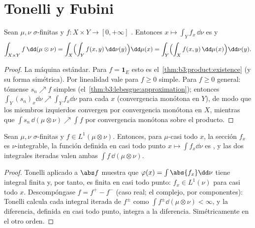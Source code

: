 \section{Tonelli y Fubini}

\begin{theorem}[Tonelli]\label{thm:b3:product:tonelli}
Sean $\mu, \nu$ $\sigma$-finitas y $f \colon X\times Y \to [0,
+\infty]$ . Entonces
$x \mapsto \int_Y f_x\,\dd\nu$ es
 y
\[
\int_{X\times Y}f\,\dd(\mu\otimes\nu)
= \int_X\Bigl(\int_Y f(x,y)\,\dd\nu(y)\Bigr)\dd\mu(x)
= \int_Y\Bigl(\int_X f(x,y)\,\dd\mu(x)\Bigr)\dd\nu(y).
\]
\end{theorem}

\begin{proof}
La máquina estándar. Para $f = \mathbf 1_E$ esto es
el~\cref{thm:b3:product:existence} (y su forma simétrica). Por
linealidad vale para $f \geq 0$ simple. Para $f \geq
0$ general: tómense $s_n \nearrow f$ simples
(el~\cref{thm:b3:lebesgue:approximation}); entonces $\int_Y(s_n)_x
\dd\nu \nearrow \int_Y f_x\dd\nu$ para cada $x$ (convergencia monótona
en $Y$), de modo que los miembros izquierdos convergen por convergencia
monótona en $X$, mientras que
$\int s_n\,\dd(\mu\otimes\nu) \nearrow \int f$ por convergencia monótona
sobre el producto.
\end{proof}

\begin{theorem}[Fubini]\label{thm:b3:product:fubini}
Sean $\mu, \nu$ $\sigma$-finitas y $f \in L^1(\mu\otimes\nu)$. Entonces,
para $\mu$-casi todo $x$, la sección $f_x$ es $\nu$-integrable, la
función definida en casi todo punto $x \mapsto \int f_x\dd\nu$ es
, y las dos integrales iteradas
valen ambas $\int f\,\dd(\mu\otimes\nu)$.
\end{theorem}

\begin{proof}
Tonelli aplicado a $\abs f$ muestra que $\varphi(x) = \int\abs{f_x}
\dd\nu$ tiene integral finita y, por tanto, es finita en casi todo
punto: $f_x \in
L^1(\nu)$ para casi todo $x$. Descompóngase $f = f^+ - f^-$ (caso real;
el complejo, por componentes): Tonelli calcula cada integral iterada de
$f^\pm$ como $\int f^\pm\dd(\mu\otimes\nu) <
\infty$, y la diferencia, definida en casi todo punto, integra a la
diferencia. Simétricamente en el otro orden.
\end{proof}

